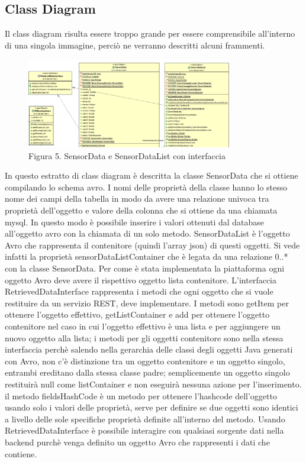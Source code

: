 \subsection{Class Diagram}
Il class diagram risulta essere troppo grande per essere comprensibile all’interno di una singola immagine, perciò ne verranno descritti alcuni frammenti. \par
\begin{figure}[h]
	\centering
	\includegraphics[width=0.8\textwidth]{sensor-data.png}
	\caption*{Figura 5. SensorData e SensorDataList con interfaccia}
\end{figure}
\noindent In questo estratto di class diagram è descritta la classe SensorData che si ottiene compilando lo schema avro. I nomi delle proprietà della classe hanno lo stesso nome dei campi della tabella in modo da avere una relazione univoca tra proprietà dell’oggetto e valore della colonna che si ottiene da una chiamata mysql. In questo modo è possibile inserire i valori ottenuti dal database all’oggetto avro con la chiamata di un solo metodo. SensorDataList è l’oggetto Avro che rappresenta il contenitore (quindi l’array json) di questi oggetti. Si vede infatti la proprietà sensorDataListContainer che è legata da una relazione 0..* con la classe SensorData. Per come è stata implementata la piattaforma ogni oggetto Avro deve avere il rispettivo oggetto lista contenitore. L’interfaccia RetrievedDataInterface rappresenta i metodi che ogni oggetto che si vuole restituire da un servizio REST, deve implementare. I metodi sono getItem per ottenere l’oggetto effettivo, getListContainer e add per ottenere l’oggetto contenitore nel caso in cui l’oggetto effettivo è una lista e per aggiungere un nuovo oggetto alla lista; i metodi per gli oggetti contenitore sono nella stessa interfaccia perchè salendo nella gerarchia delle classi degli oggetti Java generati con Avro, non c’è distinzione tra un oggetto contenitore e un oggetto singolo, entrambi ereditano dalla stessa classe padre; semplicemente un oggetto singolo restituirà null come listContainer e non eseguirà nessuna azione per l'inserimento. il metodo fieldsHashCode è un metodo per ottenere l’hashcode dell’oggetto usando solo i valori delle proprietà, serve per definire se due oggetti sono identici a livello delle sole specifiche proprietà definite all’interno del metodo. Usando RetrievedDataInterface è possibile interagire con qualsiasi sorgente dati nella backend purchè venga definito un oggetto Avro che rappresenti i dati che contiene. 
